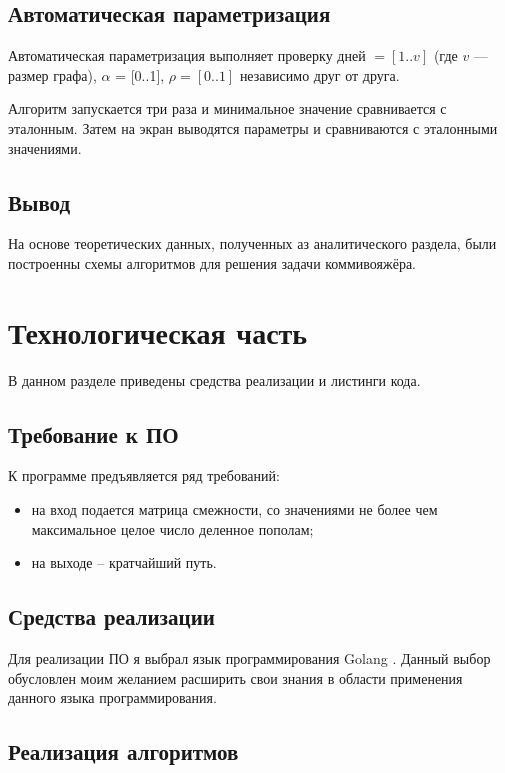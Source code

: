 \documentclass[12pt]{report}
\begin{document}
\section{Автоматическая параметризация}

Автоматическая параметризация выполняет проверку дней $= [1..v]$ (где $v$ --- размер графа), $\alpha$ = [0..1], $\rho = [0..1]$ независимо друг от друга.


Алгоритм запускается три раза и минимальное значение сравнивается с эталонным. Затем на экран выводятся параметры и сравниваются с эталонными значениями.
	
\section*{Вывод}
	
На основе теоретических данных, полученных аз аналитического раздела, были построенны схемы алгоритмов для решения задачи коммивояжёра.
	
\chapter{Технологическая часть}
	
В данном разделе приведены средства реализации и листинги кода.
	
\section{Требование к ПО}
	
К программе предъявляется ряд требований:
	
\begin{itemize}
	\item на вход подается матрица смежности, со значениями не более чем максимальное целое число деленное пополам;
	\item на выходе -- кратчайший путь.
\end{itemize}
	
\section{Средства реализации}
	
Для реализации ПО я выбрал язык программирования Golang \cite{golang}. Данный выбор обусловлен моим желанием расширить свои знания в области применения данного языка программирования.
	
\section{Реализация алгоритмов}
\end{document}
